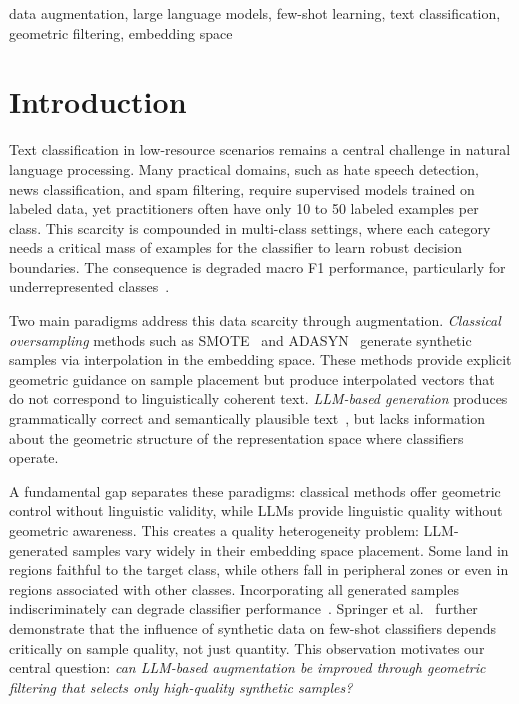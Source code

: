 \documentclass[conference]{IEEEtran}
\begin{document}
\begin{IEEEkeywords}
data augmentation, large language models, few-shot learning, text classification, geometric filtering, embedding space
\end{IEEEkeywords}

\section{Introduction}

Text classification in low-resource scenarios remains a central challenge in natural language processing. Many practical domains, such as hate speech detection, news classification, and spam filtering, require supervised models trained on labeled data, yet practitioners often have only 10 to 50 labeled examples per class. This scarcity is compounded in multi-class settings, where each category needs a critical mass of examples for the classifier to learn robust decision boundaries. The consequence is degraded macro F1 performance, particularly for underrepresented classes~\cite{gopali2024applicability}.

Two main paradigms address this data scarcity through augmentation. \textit{Classical oversampling} methods such as SMOTE~\cite{chawla2002smote} and ADASYN~\cite{he2008adasyn} generate synthetic samples via interpolation in the embedding space. These methods provide explicit geometric guidance on sample placement but produce interpolated vectors that do not correspond to linguistically coherent text. \textit{LLM-based generation} produces grammatically correct and semantically plausible text~\cite{whitehouse2023llm,brown2020fewshot}, but lacks information about the geometric structure of the representation space where classifiers operate.

A fundamental gap separates these paradigms: classical methods offer geometric control without linguistic validity, while LLMs provide linguistic quality without geometric awareness. This creates a quality heterogeneity problem: LLM-generated samples vary widely in their embedding space placement. Some land in regions faithful to the target class, while others fall in peripheral zones or even in regions associated with other classes. Incorporating all generated samples indiscriminately can degrade classifier performance~\cite{li2023synthetic,cegin2025llms}. Springer et al.~\cite{springer2025influence} further demonstrate that the influence of synthetic data on few-shot classifiers depends critically on sample quality, not just quantity. This observation motivates our central question: \textit{can LLM-based augmentation be improved through geometric filtering that selects only high-quality synthetic samples?}
\end{document}
